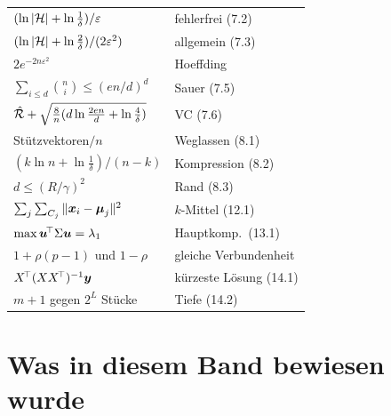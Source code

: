\begin{merksatz}
\begin{center}
{\small
\renewcommand{\arraystretch}{1.62}
\begin{tabular}{@{}P{4.4cm}P{4.2cm}@{}}
\toprule
$(\ln|\mathcal{H}| + \ln\frac1\delta)/\varepsilon$ & fehlerfrei (7.2)\\
$(\ln|\mathcal{H}| + \ln\frac2\delta)/(2\varepsilon^{2})$ & allgemein (7.3)\\
$2e^{-2n\varepsilon^{2}}$ & Hoeffding\\
$\sum_{i\le d}\binom ni \le (en/d)^{d}$ & Sauer (7.5)\\
$\hat{\mathcal{R}} + \sqrt{\frac8n(d\ln\frac{2en}{d}+\ln\frac4\delta)}$ & VC (7.6)\\
Stützvektoren$/n$ & Weglassen (8.1)\\
$(k\ln n + \ln\frac1\delta)/(n-k)$ & Kompression (8.2)\\
$d \le (R/\gamma)^{2}$ & Rand (8.3)\\
$\sum_j\sum_{C_j}\|\boldsymbol{x}_i-\boldsymbol{\mu}_j\|^{2}$ & $k$-Mittel (12.1)\\
$\max\boldsymbol{u}^{\!\top}\Sigma\boldsymbol{u} = \lambda_1$ & Hauptkomp.\ (13.1)\\
$1+\rho(p-1)$ und $1-\rho$ & gleiche Verbundenheit\\
$X^{\!\top}(XX^{\!\top})^{-1}\boldsymbol{y}$ & kürzeste Lösung (14.1)\\
$m+1$ gegen $2^{L}$ Stücke & Tiefe (14.2)\\
\bottomrule
\end{tabular}}
\end{center}
\end{merksatz}

\section{Was in diesem Band  bewiesen wurde}

